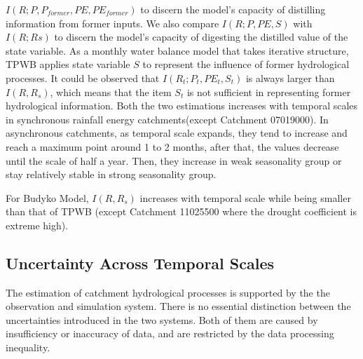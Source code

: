 \documentclass[draft,wrr]{AGUTeX}
\begin{document}
\begin{article}
$I(R;P,P_{former},PE,PE_{former})$ to discern the model's capacity of distilling information from former inputs. We also compare $I(R;P,PE,S)$ with $I(R;Rs)$ to discern the model's capacity of digesting the distilled value of the state variable.
 As a monthly water balance model that takes  iterative structure, TPWB applies state variable $S$ to represent the influence of former hydrological processes. It could be observed that $I(R_t;P_t,PE_t,S_t)$ is always larger than $I(R,R_s)$, which means that the item $S_t$ is not sufficient in representing former hydrological information. Both the two estimations increases with temporal scales in synchronous rainfall energy catchments(except Catchment 07019000). In asynchronous catchments, as temporal scale expands, they tend to increase and reach a maximum point  around 1 to 2 months, after that, the values decrease until the scale of half a year. Then, they increase in weak seasonality group or stay relatively stable in strong seasonality group.
\fi

For Budyko Model, $I(R,R_s)$ increases  with temporal scale while being smaller than that of TPWB (except Catchment 11025500 where the drought coefficient is extreme high). 


\subsection{Uncertainty Across Temporal Scales}
The estimation of catchment hydrological processes is supported by the   the observation and simulation system. There is no essential distinction between the uncertainties introduced in the two systems. Both of them are caused by insufficiency or inaccuracy of data, and are restricted by the data processing inequality\citep{cover2012elements}.


\end{article}
\end{document}

